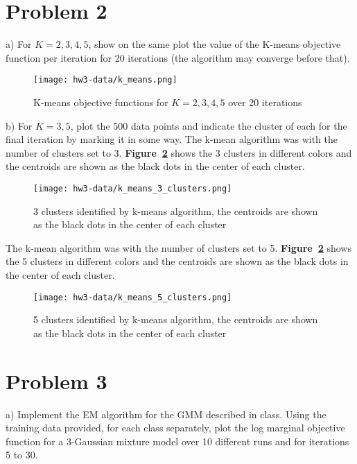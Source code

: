 \documentclass[11pt]{report}
\begin{document}
\section * {Problem 2}
a) For $K = 2, 3, 4, 5$, show on the same plot the value of the K-means objective function per iteration
for 20 iterations (the algorithm may converge before that).

\begin{figure}[h]
\texttt{[image: hw3-data/k\_means.png]}
\centering
\caption{K-means objective functions for $K=2,3,4,5$ over 20 iterations}
\label{fig:k_means}
\end{figure}

\pagebreak

\justify b) For $K = 3, 5$, plot the 500 data points and indicate the cluster of each for the final iteration by marking it in some way.
\justify The k-mean algorithm was with the number of clusters set to 3. \textbf{Figure~\ref{fig:k_means_3_clusters}} shows the 3 clusters in different colors and the centroids are shown as the black dots in the center of each cluster. 

\begin{figure}[hbt!]
\texttt{[image: hw3-data/k\_means\_3\_clusters.png]}
\centering
\caption{3 clusters identified by k-means algorithm, the centroids are shown as the black dots in the center of each cluster}
\label{fig:k_means_3_clusters}
\end{figure}
\pagebreak

\justify The k-mean algorithm was with the number of clusters set to 5. \textbf{Figure~\ref{fig:k_means_3_clusters}} shows the 5 clusters in different colors and the centroids are shown as the black dots in the center of each cluster. 
\begin{figure}[hbt!]
\texttt{[image: hw3-data/k\_means\_5\_clusters.png]}
\centering
\caption{5 clusters identified by k-means algorithm, the centroids are shown as the black dots in the center of each cluster}
\label{fig:k_means_5_clusters}
\end{figure}

\pagebreak

\section * {Problem 3}
a) Implement the EM algorithm for the GMM described in class. Using the training data provided, for each class separately, plot the log marginal objective function for a 3-Gaussian mixture model over 10 different runs and for iterations 5 to 30.
\end{document}
